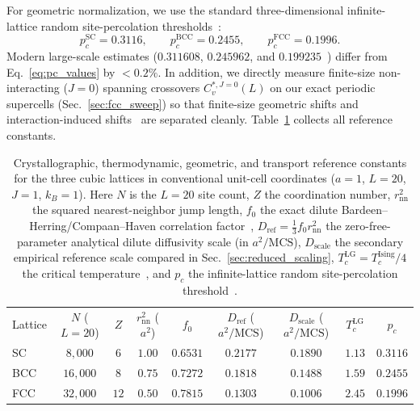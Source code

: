 \documentclass[aps,pre,reprint,superscriptaddress,amsmath,amssymb,floatfix]{revtex4-2}
\begin{document}
For geometric normalization, we use the standard three-dimensional infinite-lattice random site-percolation thresholds~\cite{Stauffer1994,Lorenz1998,Wang2013}:
\begin{equation}
  p_c^{\mathrm{SC}} = 0.3116, \qquad p_c^{\mathrm{BCC}} = 0.2455, \qquad p_c^{\mathrm{FCC}} = 0.1996.
  \label{eq:pc_values}
\end{equation}
Modern large-scale estimates ($0.311608$, $0.245962$, and $0.199235$~\cite{Lorenz1998,Wang2013}) differ from Eq.~\eqref{eq:pc_values} by $< 0.2\%$. In addition, we directly measure finite-size non-interacting ($J=0$) spanning crossovers $C_v^{*,J=0}(L)$ on our exact periodic supercells (Sec.~\ref{sec:fcc_sweep}) so that finite-size geometric shifts and interaction-induced shifts~\cite{MullerKrumbhaar1974,Coniglio1980,Kertesz1989,DOnorioDeMeo1990,Zhu2026} are separated cleanly. Table~\ref{tab:lattice_specs} collects all reference constants.

\begin{table}[t]
\caption{\label{tab:lattice_specs}Crystallographic, thermodynamic, geometric, and transport reference constants for the three cubic lattices in conventional unit-cell coordinates ($a=1$, $L=20$, $J=1$, $k_B=1$). Here $N$ is the $L=20$ site count, $Z$ the coordination number, $r_{\mathrm{nn}}^2$ the squared nearest-neighbor jump length, $f_0$ the exact dilute Bardeen--Herring/Compaan--Haven correlation factor~\cite{Compaan1956,Manning1968}, $D_{\mathrm{ref}} = \frac{1}{3}f_0 r_{\mathrm{nn}}^2$ the zero-free-parameter analytical dilute diffusivity scale (in $a^2/\mathrm{MCS}$), $D_{\mathrm{scale}}$ the secondary empirical reference scale compared in Sec.~\ref{sec:reduced_scaling}, $T_c^{\mathrm{LG}} = T_c^{\mathrm{Ising}}/4$ the critical temperature~\cite{Ferrenberg2018,Lundow2009}, and $p_c$ the infinite-lattice random site-percolation threshold~\cite{Stauffer1994,Lorenz1998}.}
\begin{ruledtabular}
\begin{tabular}{lcccccccc}
Lattice & $N$ ($L=20$) & $Z$ & $r_{\mathrm{nn}}^2$ ($a^2$) & $f_0$ & $D_{\mathrm{ref}}$ ($a^2/\mathrm{MCS}$) & $D_{\mathrm{scale}}$ ($a^2/\mathrm{MCS}$) & $T_c^{\mathrm{LG}}$ & $p_c$ \\
\colrule
SC  & $8{,}000$  & $6$  & $1.00$ & $0.6531$ & $0.2177$ & $0.1890$ & $1.13$ & $0.3116$ \\
BCC & $16{,}000$ & $8$  & $0.75$ & $0.7272$ & $0.1818$ & $0.1488$ & $1.59$ & $0.2455$ \\
FCC & $32{,}000$ & $12$ & $0.50$ & $0.7815$ & $0.1303$ & $0.1006$ & $2.45$ & $0.1996$ \\
\end{tabular}
\end{ruledtabular}
\end{table}
\end{document}
